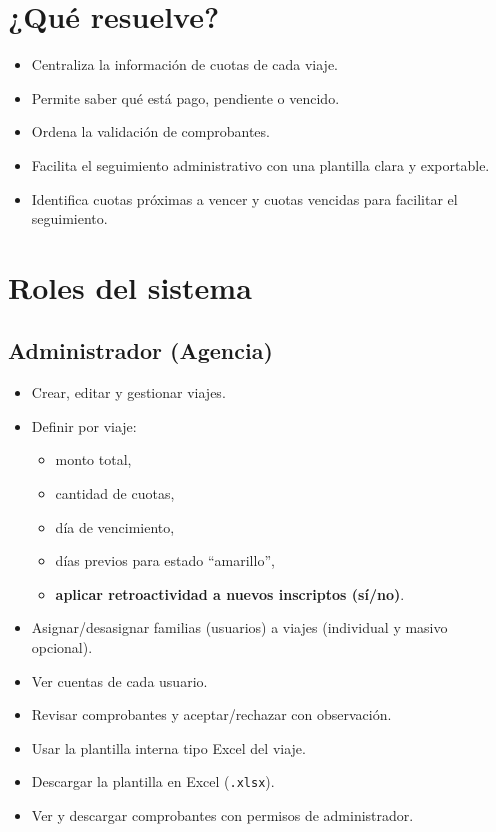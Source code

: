 \documentclass[12pt,a4paper]{article}
\begin{document}
\section{¿Qué resuelve?}
\begin{itemize}[leftmargin=*]
    \item Centraliza la información de cuotas de cada viaje.
    \item Permite saber qué está pago, pendiente o vencido.
    \item Ordena la validación de comprobantes.
    \item Facilita el seguimiento administrativo con una plantilla clara y exportable.
    \item Identifica cuotas próximas a vencer y cuotas vencidas para facilitar el seguimiento.
\end{itemize}

\section{Roles del sistema}

\subsection{Administrador (Agencia)}
\begin{itemize}[leftmargin=*]
    \item Crear, editar y gestionar viajes.
    \item Definir por viaje:
    \begin{itemize}
        \item monto total,
        \item cantidad de cuotas,
        \item día de vencimiento,
        \item días previos para estado ``amarillo'',
        \item \textbf{aplicar retroactividad a nuevos inscriptos (sí/no)}.
    \end{itemize}
    \item Asignar/desasignar familias (usuarios) a viajes (individual y masivo opcional).
    \item Ver cuentas de cada usuario.
    \item Revisar comprobantes y aceptar/rechazar con observación.
    \item Usar la plantilla interna tipo Excel del viaje.
    \item Descargar la plantilla en Excel (\texttt{.xlsx}).
    \item Ver y descargar comprobantes con permisos de administrador.
\end{itemize}
\end{document}
